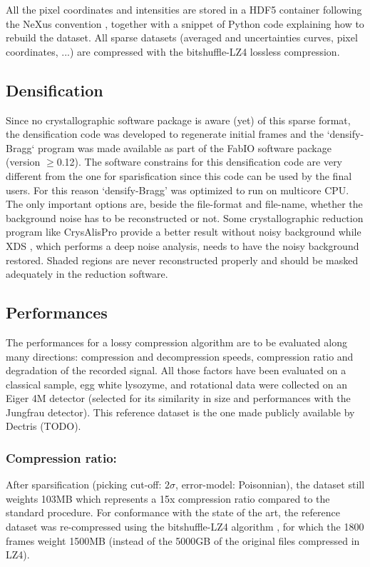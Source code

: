 \documentclass[preprint]{iucr}              %
\begin{document}
All the pixel coordinates and intensities are stored in a HDF5 container \cite{hdf5} following the NeXus  convention \cite{nexus}, together with a snippet of Python code explaining how to rebuild the dataset.
All sparse datasets (averaged and uncertainties curves, pixel coordinates, ...) are compressed with the bitshuffle-LZ4 \cite{bitshuffle} lossless compression.

\subsection{Densification}
Since no crystallographic software package is aware (yet) of this sparse format, the densification code was developed to regenerate initial frames and the `densify-Bragg` program was made available as part of the FabIO \cite{fabio} software package (version $\ge$0.12). 
The software constrains for this densification code are very different from the one for sparisfication since this code can be used by the final users.
For this reason `densify-Bragg' was optimized to run on multicore CPU.
The only important options are, beside the file-format and file-name, whether the background noise has to be reconstructed or not. 
Some crystallographic reduction program like CrysAlisPro \cite{crysalis} provide a better result without noisy background while XDS \cite{xds}, which performs a deep noise analysis, needs to have the noisy background restored. 
Shaded regions are never reconstructed properly and should be masked adequately in the reduction software.

\subsection{Performances}
The performances for a lossy compression algorithm are to be evaluated along many directions: compression and decompression speeds, compression ratio and degradation of the recorded signal.
All those factors have been evaluated on a classical sample, egg white lysozyme, and rotational data were collected on an Eiger 4M detector (selected for its similarity in size and performances with the Jungfrau detector). 
This reference dataset is the one made publicly available by Dectris \cite{lysozyme} (TODO). 

\subsubsection{Compression ratio:} 
After sparsification (picking cut-off: $2\sigma$, error-model: Poisonnian), the dataset still weights 103MB which represents a 15x compression ratio compared to the standard procedure.
For conformance with the state of the art, the reference dataset was re-compressed using the bitshuffle-LZ4 algorithm \cite{bitshuffle}, for which the 1800 frames weight 1500MB (instead of the 5000GB of the original files compressed in LZ4).
\end{document}
